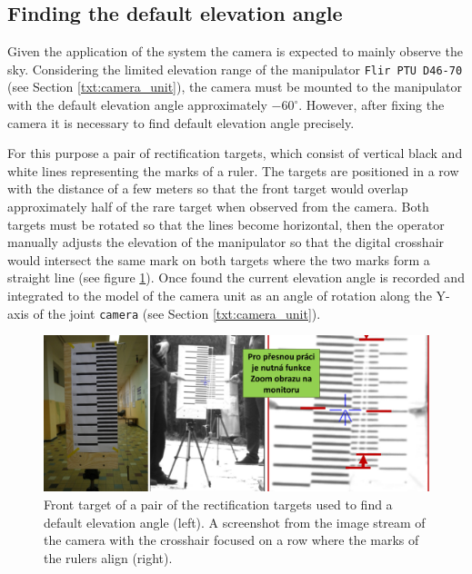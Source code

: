 \subsection{Finding the default elevation angle}

Given the application of the system the camera is expected to mainly observe the sky. Considering the limited elevation range of the manipulator \texttt{Flir PTU D46-70} (see Section \ref{txt:camera_unit}), the camera must be mounted to the manipulator with the default elevation angle approximately $-60^{\circ}$. However, after fixing the camera it is necessary to find default elevation angle precisely. 

For this purpose a pair of rectification targets, which consist of vertical black and white lines representing the marks of a ruler. The targets are positioned in a row with the distance of a few meters so that the front target would overlap approximately half of the rare target when observed from the camera. Both targets must be rotated so that the lines become horizontal, then the operator manually adjusts the elevation of the manipulator so that the digital crosshair would intersect the same mark on both targets where the two marks form a straight line (see figure \ref{fig:rect_default_elevation_angle}). Once found the current elevation angle is recorded and integrated to the model of the camera unit as an angle of rotation along the Y-axis of the joint \texttt{camera} (see Section \ref{txt:camera_unit}).

\begin{figure}[htb]
	\centering
	\includegraphics[width=13cm]{fig/rect_default_elevation_angle.png}
	\caption{Front target of a pair of the rectification targets used to find a default elevation angle (left). A screenshot from the image stream of the camera with the crosshair focused on a row where the marks of the rulers align (right).}
	\label{fig:rect_default_elevation_angle}
\end{figure}


